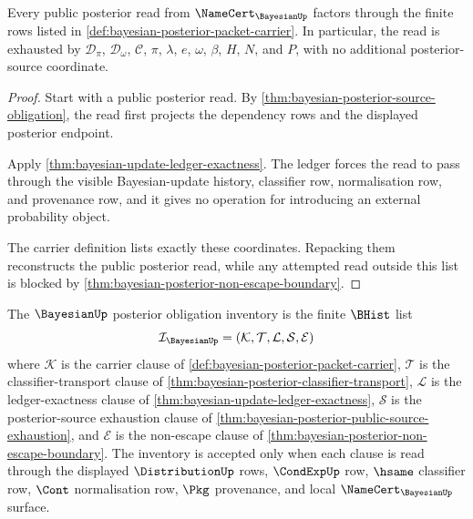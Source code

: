 \begin{theorem}
\label{thm:bayesian-posterior-public-source-exhaustion}
Every public posterior read from $\NameCert_{\BayesianUp}$ factors through the finite rows listed in \autoref{def:bayesian-posterior-packet-carrier}. In particular, the read is exhausted by $\mathcal{D}_{\pi}$, $\mathcal{D}_{\omega}$, $\mathcal{C}$, $\pi$, $\lambda$, $e$, $\omega$, $\beta$, $H$, $N$, and $P$, with no additional posterior-source coordinate.
\end{theorem}
\begin{proof}
Start with a public posterior read. By \autoref{thm:bayesian-posterior-source-obligation}, the read first projects the dependency rows and the displayed posterior endpoint.

Apply \autoref{thm:bayesian-update-ledger-exactness}. The ledger forces the read to pass through the visible Bayesian-update history, classifier row, normalisation row, and provenance row, and it gives no operation for introducing an external probability object.

The carrier definition lists exactly these coordinates. Repacking them reconstructs the public posterior read, while any attempted read outside this list is blocked by \autoref{thm:bayesian-posterior-non-escape-boundary}.
\end{proof}

\begin{definition}
\label{def:bayesian-posterior-obligation-inventory}
The $\BayesianUp$ posterior obligation inventory is the finite $\BHist$ list
$$
\mathcal{I}_{\BayesianUp}=(\mathcal{K},\mathcal{T},\mathcal{L},\mathcal{S},\mathcal{E})
$$
where $\mathcal{K}$ is the carrier clause of \autoref{def:bayesian-posterior-packet-carrier}, $\mathcal{T}$ is the classifier-transport clause of \autoref{thm:bayesian-posterior-classifier-transport}, $\mathcal{L}$ is the ledger-exactness clause of \autoref{thm:bayesian-update-ledger-exactness}, $\mathcal{S}$ is the posterior-source exhaustion clause of \autoref{thm:bayesian-posterior-public-source-exhaustion}, and $\mathcal{E}$ is the non-escape clause of \autoref{thm:bayesian-posterior-non-escape-boundary}. The inventory is accepted only when each clause is read through the displayed $\DistributionUp$ rows, $\CondExpUp$ row, $\hsame$ classifier row, $\Cont$ normalisation row, $\Pkg$ provenance, and local $\NameCert_{\BayesianUp}$ surface.
\end{definition}

